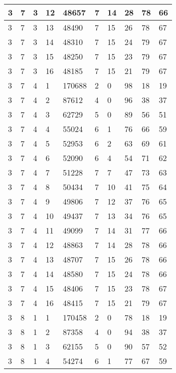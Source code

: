 \begin{table}[!ht]
\begin{tabular}{|l|l|l|l|l|l|l|l|l|l|}
        3 & 7 & 3 & 12 & 48657 & 7 & 14 & 28 & 78 & 66 \\ \hline
        3 & 7 & 3 & 13 & 48490 & 7 & 15 & 26 & 78 & 67 \\ \hline
        3 & 7 & 3 & 14 & 48310 & 7 & 15 & 24 & 79 & 67 \\ \hline
        3 & 7 & 3 & 15 & 48250 & 7 & 15 & 23 & 79 & 67 \\ \hline
        3 & 7 & 3 & 16 & 48185 & 7 & 15 & 21 & 79 & 67 \\ \hline
        3 & 7 & 4 & 1 & 170688 & 2 & 0 & 98 & 18 & 19 \\ \hline
        3 & 7 & 4 & 2 & 87612 & 4 & 0 & 96 & 38 & 37 \\ \hline
        3 & 7 & 4 & 3 & 62729 & 5 & 0 & 89 & 56 & 51 \\ \hline
        3 & 7 & 4 & 4 & 55024 & 6 & 1 & 76 & 66 & 59 \\ \hline
        3 & 7 & 4 & 5 & 52953 & 6 & 2 & 63 & 69 & 61 \\ \hline
        3 & 7 & 4 & 6 & 52090 & 6 & 4 & 54 & 71 & 62 \\ \hline
        3 & 7 & 4 & 7 & 51228 & 7 & 7 & 47 & 73 & 63 \\ \hline
        3 & 7 & 4 & 8 & 50434 & 7 & 10 & 41 & 75 & 64 \\ \hline
        3 & 7 & 4 & 9 & 49806 & 7 & 12 & 37 & 76 & 65 \\ \hline
        3 & 7 & 4 & 10 & 49437 & 7 & 13 & 34 & 76 & 65 \\ \hline
        3 & 7 & 4 & 11 & 49099 & 7 & 14 & 31 & 77 & 66 \\ \hline
        3 & 7 & 4 & 12 & 48863 & 7 & 14 & 28 & 78 & 66 \\ \hline
        3 & 7 & 4 & 13 & 48707 & 7 & 15 & 26 & 78 & 66 \\ \hline
        3 & 7 & 4 & 14 & 48580 & 7 & 15 & 24 & 78 & 66 \\ \hline
        3 & 7 & 4 & 15 & 48406 & 7 & 15 & 23 & 78 & 67 \\ \hline
        3 & 7 & 4 & 16 & 48415 & 7 & 15 & 21 & 79 & 67 \\ \hline
        3 & 8 & 1 & 1 & 170458 & 2 & 0 & 78 & 18 & 19 \\ \hline
        3 & 8 & 1 & 2 & 87358 & 4 & 0 & 94 & 38 & 37 \\ \hline
        3 & 8 & 1 & 3 & 62155 & 5 & 0 & 90 & 57 & 52 \\ \hline
        3 & 8 & 1 & 4 & 54274 & 6 & 1 & 77 & 67 & 59 \\ \hline

\end{tabular}
\end{table}
